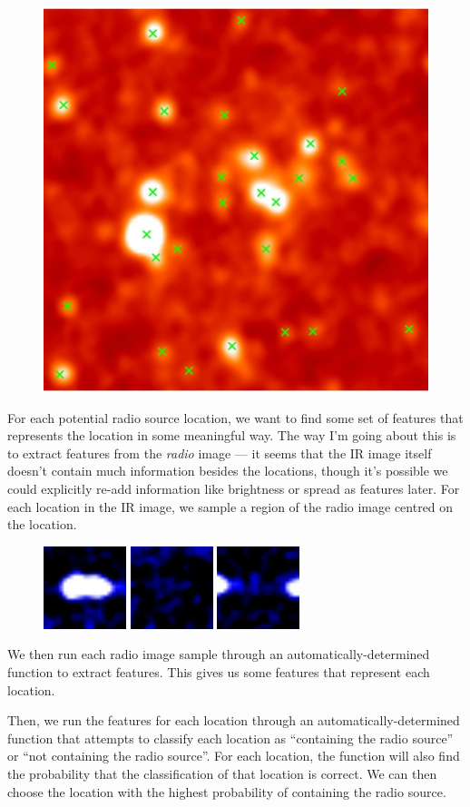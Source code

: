 \documentclass[a4paper]{article}
\begin{document}
    \begin{figure}[!ht]
        \centering
        \includegraphics[width=0.3\linewidth]{images/ARG000180p_ir_potential_hosts.jpg}
    \end{figure}

    For each potential radio source location, we want to find some set of features that represents the location in some meaningful way. The way I'm going about this is to extract features from the \emph{radio} image --- it seems that the IR image itself doesn't contain much information besides the locations, though it's possible we could explicitly re-add information like brightness or spread as features later. For each location in the IR image, we sample a region of the radio image centred on the location.

    \begin{figure}[!ht]
        \centering
        \includegraphics[width=0.15\linewidth]{images/radio_neighbourhood_1.png}\quad
        \includegraphics[width=0.15\linewidth]{images/radio_neighbourhood_2.png}\quad
        \includegraphics[width=0.15\linewidth]{images/radio_neighbourhood_3.png}
    \end{figure}

    We then run each radio image sample through an automatically-determined function to extract features. This gives us some features that represent each location.

    Then, we run the features for each location through an automatically-determined function that attempts to classify each location as ``containing the radio source'' or ``not containing the radio source''. For each location, the function will also find the probability that the classification of that location is correct. We can then choose the location with the highest probability of containing the radio source.


% 
% 
\end{document}
